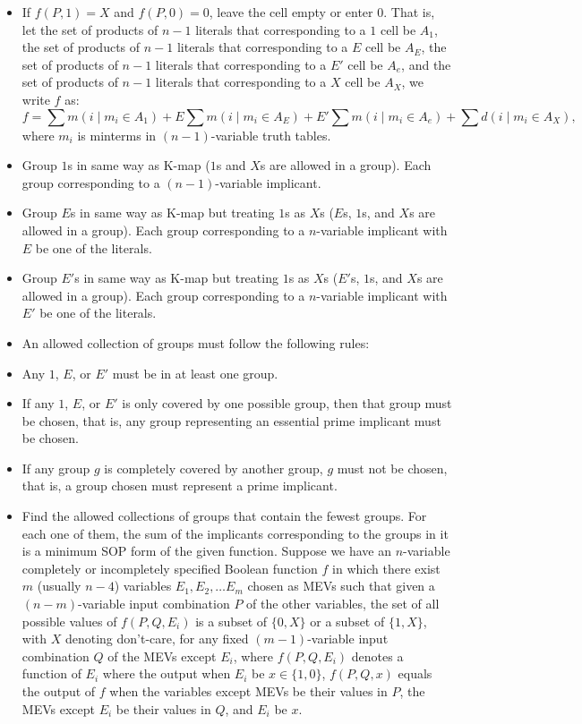 \documentclass[a4paper,12pt]{article}
\begin{document}
\begin{itemize}
\begin{itemize}
\begin{itemize}
\begin{itemize}
\begin{itemize}
\begin{itemize}
\begin{itemize}
\item If $f(P,1)=X$ and $f(P,0)=0$, leave the cell empty or enter $0$.
\eit
That is, let the set of products of $n-1$ literals that corresponding to a $1$ cell be $A_1$, the set of products of $n-1$ literals that corresponding to a $E$ cell be $A_E$, the set of products of $n-1$ literals that corresponding to a $E'$ cell be $A_e$, and the set of products of $n-1$ literals that corresponding to a $X$ cell be $A_X$, we write $f$ as:
\[f=\sum m(i\mid m_i\in A_1)+E\sum m(i\mid m_i\in A_E)+E'\sum m(i\mid m_i\in A_e)+\sum d(i\mid m_i\in A_X),\]
where $m_i$ is minterms in $(n-1)$-variable truth tables.
\item Group $1$s in same way as K-map ($1$s and $X$s are allowed in a group). Each group corresponding to a $(n-1)$-variable implicant.
\item Group $E$s in same way as K-map but treating $1$s as $X$s ($E$s, $1$s, and $X$s are allowed in a group). Each group corresponding to a $n$-variable implicant with $E$ be one of the literals.
\item Group $E'$s in same way as K-map but treating $1$s as $X$s ($E'$s, $1$s, and $X$s are allowed in a group). Each group corresponding to a $n$-variable implicant with $E'$ be one of the literals.
\item An allowed collection of groups must follow the following rules:
\bit
\item Any $1$, $E$, or $E'$ must be in at least one group.
\item If any $1$, $E$, or $E'$ is only covered by one possible group, then that group must be chosen, that is, any group representing an essential prime implicant must be chosen.
\item If any group $g$ is completely covered by another group, $g$ must not be chosen, that is, a group chosen must represent a prime implicant.
\eit
\item Find the allowed collections of groups that contain the fewest groups. For each one of them, the sum of the implicants corresponding to the groups in it is a minimum SOP form of the given function.
\een
{}
Suppose we have an $n$-variable completely or incompletely specified Boolean function $f$ in which there exist $m$ (usually $n-4$) variables $E_1,E_2,\ldots E_m$ chosen as MEVs such that given a $(n-m)$-variable input combination $P$ of the other variables, the set of all possible values of $f(P,Q,E_i)$ is a subset of $\{0,X\}$ or a subset of $\{1,X\}$, with $X$ denoting don't-care, for any fixed $(m-1)$-variable input combination $Q$ of the MEVs except $E_i$, where $f(P,Q,E_i)$ denotes a function of $E_i$ where the output when $E_i$ be $x\in\{1,0\}$, $f(P,Q,x)$ equals the output of $f$ when the variables except MEVs be their values in $P$, the MEVs except $E_i$ be their values in $Q$, and $E_i$ be $x$.

\end{itemize}
\end{itemize}
\end{itemize}
\end{itemize}
\end{itemize}
\end{itemize}
\end{itemize}
\end{document}
